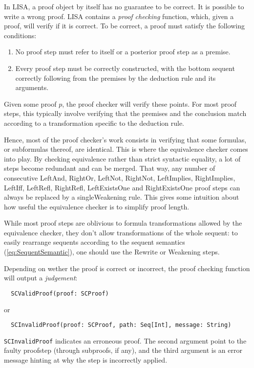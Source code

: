 In LISA, a proof object by itself has no guarantee to be correct. It is possible to write a wrong proof. LISA contains a \textit{proof checking} function, which, given a proof, will verify if it is correct. To be correct, a proof must satisfy the following conditions:
\begin{enumerate}
  \item No proof step must refer to itself or a posterior proof step as a premise.
  \item Every proof step must be correctly constructed, with the bottom sequent correctly following from the premises by the deduction rule and its arguments.
\end{enumerate}


Given some proof $p$, the proof checker will verify these points. For most proof steps, this typically involve verifying that the premises and the conclusion match according to a transformation specific to the deduction rule.

Hence, most of the proof checker's work consists in verifying that some formulas, or subformulas thereof, are identical. This is where the equivalence checker comes into play. By checking equivalence rather than strict syntactic equality, a lot of steps become redundant and can be merged. That way,  any number of consecutive {LeftAnd}, {RightOr}, {LeftNot}, {RightNot}, {LeftImplies}, {RightImplies}, {LeftIff}, {LeftRefl}, {RightRefl}, {LeftExistsOne} and  {RightExistsOne} proof steps can always be replaced by a single{Weakening} rule. This gives some intuition about how useful the equivalence checker is to simplify proof length.

While most proof steps are oblivious to formula transformations allowed by the equivalence checker, they don't allow transformations of the whole sequent: to easily rearrange sequents according to the sequent semantics (\autoref{eq:SequentSemantic}), one should use the Rewrite or Weakening steps.

Depending on wether the proof is correct or incorrect, the proof checking function will output a \textit{judgement}:
\begin{lstlisting}
  SCValidProof(proof: SCProof)
\end{lstlisting}
or
\begin{lstlisting}
  SCInvalidProof(proof: SCProof, path: Seq[Int], message: String)
\end{lstlisting}

\lstinline|SCInvalidProof|{} indicates an erroneous proof. The second argument point to the faulty proofstep (through subproofs, if any), and the third argument is an error message hinting at why the step is incorrectly applied.

